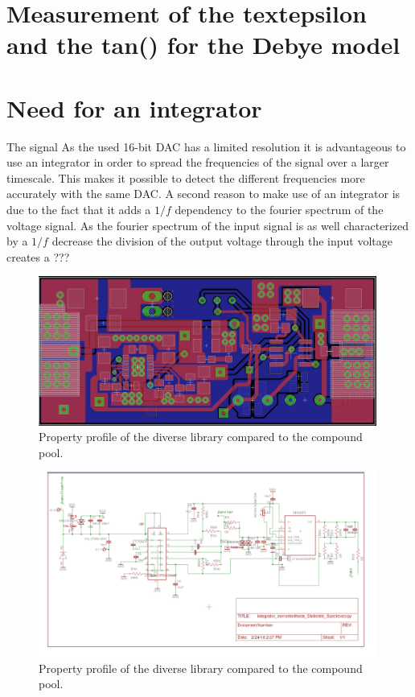 \section{Measurement of the textepsilon and the tan(\textdelta) for the Debye model}




\section{Need for an integrator}
The signal 
As the used 16-bit DAC has a limited resolution it is advantageous to use an integrator in order to spread the frequencies of the signal over a larger timescale. This makes it possible to detect the different frequencies more accurately with the same DAC. 
A second reason to make use of an integrator is due to the fact that it adds a $1/f$ dependency to the fourier spectrum of the voltage signal. As the fourier spectrum of the input signal is as well characterized by a $1/f$ decrease the division of the output voltage through the input voltage creates a ???
\newpage

\begin{figure}
\includegraphics[width=0.99\textwidth]{figures/Method/integrator/PCB_Integrator.png}
    \caption{Property profile of the diverse library compared to the compound pool.}
    
    \end{figure}	
    
    
    \newpage
    
    	\begin{figure}
\includegraphics[width=0.99\textwidth]{figures/Method/integrator/schematic.jpg}
 \caption{Property profile of the diverse library compared to the compound pool.}
  \end{figure}	

